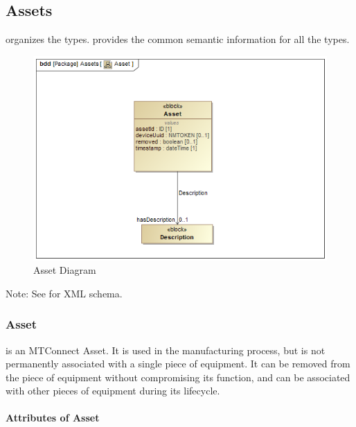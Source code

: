 \subsection{Assets} \label{sec:Assets}


 \glspl{organize} the  types.  provides the common semantic information for all the  types.

\begin{figure}[ht]
  \centering
    \includegraphics[width=1.0\textwidth]{figures/Asset.png}
  \caption{Asset Diagram}
  \label{fig:Asset Diagram}
\end{figure}

\FloatBarrier


Note: See  for XML schema.


\subsubsection{Asset}
\label{sec:Asset}



 is an \gls{MTConnect Asset}. It is used in the manufacturing process, but is not permanently associated with a single piece of equipment. It can be removed from the piece of equipment without compromising its function, and can be associated with other pieces of equipment during its lifecycle.


\paragraph{Attributes of Asset}\mbox{}
\label{sec:Attributes of Asset}


